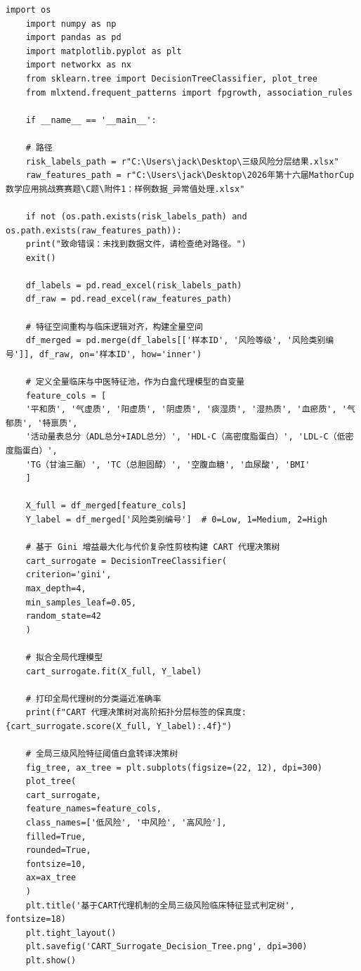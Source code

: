 \documentclass[12pt]{article}
\begin{document}
\begin{lstlisting}[caption={CART代理决策树+FP-Growth关联规则挖掘}, label={code:cart_fpgrowth}]
	import os
	import numpy as np
	import pandas as pd
	import matplotlib.pyplot as plt
	import networkx as nx
	from sklearn.tree import DecisionTreeClassifier, plot_tree
	from mlxtend.frequent_patterns import fpgrowth, association_rules
	
	if __name__ == '__main__':
	
	# 路径
	risk_labels_path = r"C:\Users\jack\Desktop\三级风险分层结果.xlsx"
	raw_features_path = r"C:\Users\jack\Desktop\2026年第十六届MathorCup数学应用挑战赛赛题\C题\附件1：样例数据_异常值处理.xlsx"
	
	if not (os.path.exists(risk_labels_path) and os.path.exists(raw_features_path)):
	print("致命错误：未找到数据文件，请检查绝对路径。")
	exit()
	
	df_labels = pd.read_excel(risk_labels_path)
	df_raw = pd.read_excel(raw_features_path)
	
	# 特征空间重构与临床逻辑对齐，构建全量空间
	df_merged = pd.merge(df_labels[['样本ID', '风险等级', '风险类别编号']], df_raw, on='样本ID', how='inner')
	
	# 定义全量临床与中医特征池，作为白盒代理模型的自变量
	feature_cols = [
	'平和质', '气虚质', '阳虚质', '阴虚质', '痰湿质', '湿热质', '血瘀质', '气郁质', '特禀质',
	'活动量表总分（ADL总分+IADL总分）', 'HDL-C（高密度脂蛋白）', 'LDL-C（低密度脂蛋白）',
	'TG（甘油三酯）', 'TC（总胆固醇）', '空腹血糖', '血尿酸', 'BMI'
	]
	
	X_full = df_merged[feature_cols]
	Y_label = df_merged['风险类别编号']  # 0=Low, 1=Medium, 2=High
	
	# 基于 Gini 增益最大化与代价复杂性剪枝构建 CART 代理决策树
	cart_surrogate = DecisionTreeClassifier(
	criterion='gini',
	max_depth=4,
	min_samples_leaf=0.05,
	random_state=42
	)
	
	# 拟合全局代理模型
	cart_surrogate.fit(X_full, Y_label)
	
	# 打印全局代理树的分类逼近准确率
	print(f"CART 代理决策树对高阶拓扑分层标签的保真度: {cart_surrogate.score(X_full, Y_label):.4f}")
	
	# 全局三级风险特征阈值白盒转译决策树
	fig_tree, ax_tree = plt.subplots(figsize=(22, 12), dpi=300)
	plot_tree(
	cart_surrogate,
	feature_names=feature_cols,
	class_names=['低风险', '中风险', '高风险'],
	filled=True,
	rounded=True,
	fontsize=10,
	ax=ax_tree
	)
	plt.title('基于CART代理机制的全局三级风险临床特征显式判定树', fontsize=18)
	plt.tight_layout()
	plt.savefig('CART_Surrogate_Decision_Tree.png', dpi=300)
	plt.show()
	

\end{lstlisting}
\end{document}
